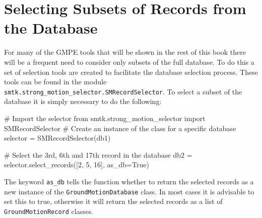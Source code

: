\section{Selecting Subsets of Records from the Database}
\label{sec:sm_selector}

For many of the GMPE tools that will be shown in the rest of this book there will be a frequent need to consider only subsets of the full database. To do this a set of selection tools are created to facilitate the database selection process. These tools can be found in the module \verb=smtk.strong_motion_selector.SMRecordSelector=. To select a subset of the database it is simply necessary to do the following:

\begin{python}[frame=single]
# Import the selector
from smtk.strong_motion_selector import SMRecordSelector
# Create an instance of the class for a specific database
selector = SMRecordSelector(db1)

# Select the 3rd, 6th and 17th record in the database
db2 = selector.select_records([2, 5, 16], as_db=True)
\end{python}

The keyword \verb=as_db= tells the function whether to return the selected records as a new instance of the \verb=GroundMotionDatabase= class. In most cases it is advisable to set this to true, otherwise it will return the selected records as a list of \verb=GroundMotionRecord= classes.

